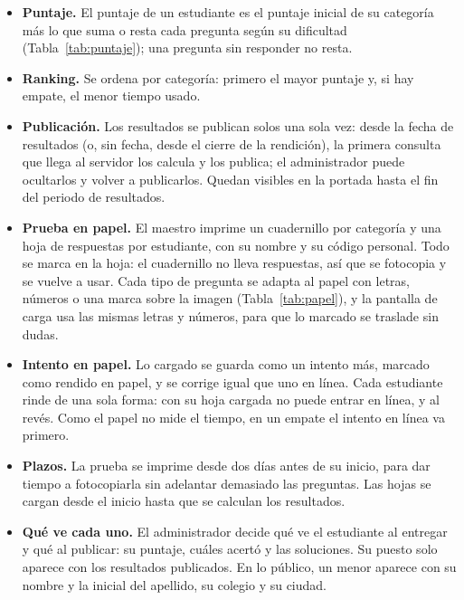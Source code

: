 \begin{itemize}
    \item \textbf{Puntaje.} El puntaje de un estudiante es el puntaje inicial de su categoría más lo que suma o resta cada pregunta según su dificultad (Tabla~\ref{tab:puntaje}); una pregunta sin responder no resta.
    \item \textbf{Ranking.} Se ordena por categoría: primero el mayor puntaje y, si hay empate, el menor tiempo usado.
    \item \textbf{Publicación.} Los resultados se publican solos una sola vez: desde la fecha de resultados (o, sin fecha, desde el cierre de la rendición), la primera consulta que llega al servidor los calcula y los publica; el administrador puede ocultarlos y volver a publicarlos. Quedan visibles en la portada hasta el fin del periodo de resultados.
    \item \textbf{Prueba en papel.} El maestro imprime un cuadernillo por categoría y una hoja de respuestas por estudiante, con su nombre y su código personal. Todo se marca en la hoja: el cuadernillo no lleva respuestas, así que se fotocopia y se vuelve a usar. Cada tipo de pregunta se adapta al papel con letras, números o una marca sobre la imagen (Tabla~\ref{tab:papel}), y la pantalla de carga usa las mismas letras y números, para que lo marcado se traslade sin dudas.
    \item \textbf{Intento en papel.} Lo cargado se guarda como un intento más, marcado como rendido en papel, y se corrige igual que uno en línea. Cada estudiante rinde de una sola forma: con su hoja cargada no puede entrar en línea, y al revés. Como el papel no mide el tiempo, en un empate el intento en línea va primero.
    \item \textbf{Plazos.} La prueba se imprime desde dos días antes de su inicio, para dar tiempo a fotocopiarla sin adelantar demasiado las preguntas. Las hojas se cargan desde el inicio hasta que se calculan los resultados.
    \item \textbf{Qué ve cada uno.} El administrador decide qué ve el estudiante al entregar y qué al publicar: su puntaje, cuáles acertó y las soluciones. Su puesto solo aparece con los resultados publicados. En lo público, un menor aparece con su nombre y la inicial del apellido, su colegio y su ciudad.
\end{itemize}

